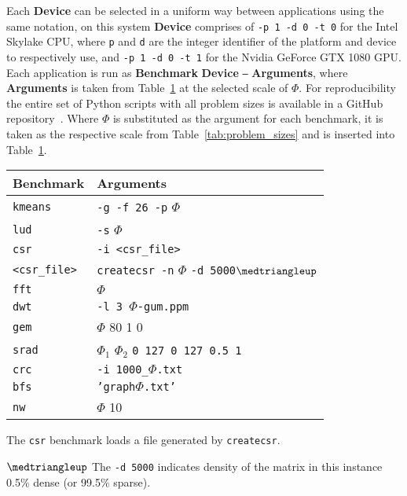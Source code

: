 \documentclass[../document.tex]{subfiles}
\begin{document}
Each {\bf Device} can be selected in a uniform way between applications using the same notation, on this system {\bf Device} comprises of {\tt -p 1 -d 0 -t 0} for the Intel Skylake CPU, where {\tt p} and {\tt d} are the integer identifier of the platform and device to respectively use, and {\tt -p 1 -d 0 -t 1} for the Nvidia GeForce GTX 1080 GPU.
Each application is run as {\bf Benchmark} {\bf Device} {\tt --} {\bf Arguments}, where {\bf Arguments} is taken from Table~\ref{tab:program_arguments} at the selected scale of $\Phi$.
For reproducibility the entire set of Python scripts with all problem sizes is available in a GitHub repository~\cite{johnston2017}. 
Where $\Phi$ is substituted as the argument for each benchmark, it is taken as the respective scale from Table~\ref{tab:problem_sizes} and is inserted into Table~\ref{tab:program_arguments}.

\begin{table}[t]
	\centering
	\begin{threeparttable}
		\centering
		\vspace{0pt}
		\begin{tabular}{l|l}
			\bf Benchmark & \bf Arguments\\\hline
			{\tt kmeans} & {\tt -g -f 26 -p} $\Phi$\\
			{\tt lud} & {\tt -s} $\Phi$\\
			{\tt csr}\textdagger & {\tt -i <csr\_file>}\\
			{\tt <csr\_file>} & {\tt createcsr -n} $\Phi$ {\tt -d 5000}$\medtriangleup$\\
			{\tt fft} & $\Phi$ \\
			{\tt dwt} & {\tt -l 3 }$\Phi${\tt-gum.ppm}\\
			{\tt gem} & $\Phi$ {80 1 0}\\
			{\tt srad}& $\Phi_1$ $\Phi_2$ {\tt 0 127 0 127 0.5 1}\\
			{\tt crc}&  {\tt -i 1000\_}$\Phi${\tt.txt}\\
            {\tt bfs}&  {\tt 'graph}$\Phi${\tt.txt'}\\
            {\tt nw}&  $\Phi${ 10}\\
		\end{tabular}
		\begin{tablenotes}
			\item [\textdagger] The {\tt csr} benchmark loads a file generated by {\tt createcsr}.
			\item [$\medtriangleup$] The {\tt -d 5000} indicates density of the matrix in this instance 0.5\% dense (or 99.5\% sparse).
		\end{tablenotes}
		\label{tab:program_arguments}
	\end{threeparttable}
\end{table}
\end{document}
